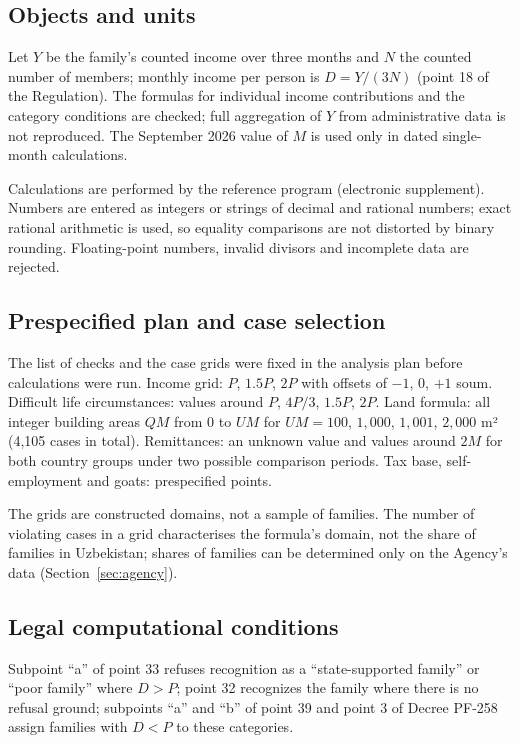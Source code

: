 \documentclass[12pt,a4paper]{extarticle}
\begin{document}
\subsection{Objects and units}
Let $Y$ be the family’s counted income over three months and $N$ the counted number of members; monthly income per person is $D=Y/(3N)$ (point 18 of the Regulation). The formulas for individual income contributions and the category conditions are checked; full aggregation of $Y$ from administrative data is not reproduced. The September 2026 value of $M$ is used only in dated single-month calculations.

Calculations are performed by the reference program (electronic supplement). Numbers are entered as integers or strings of decimal and rational numbers; exact rational arithmetic is used, so equality comparisons are not distorted by binary rounding. Floating-point numbers, invalid divisors and incomplete data are rejected.

\subsection{Prespecified plan and case selection}
The list of checks and the case grids were fixed in the analysis plan before calculations were run. Income grid: $P$, $1.5P$, $2P$ with offsets of $-1$, $0$, $+1$ soum. Difficult life circumstances: values around $P$, $4P/3$, $1.5P$, $2P$. Land formula: all integer building areas $QM$ from $0$ to $UM$ for $UM=100$, $1{,}000$, $1{,}001$, $2{,}000$ m² (4,105 cases in total). Remittances: an unknown value and values around $2M$ for both country groups under two possible comparison periods. Tax base, self-employment and goats: prespecified points.

The grids are constructed domains, not a sample of families. The number of violating cases in a grid characterises the formula’s domain, not the share of families in Uzbekistan; shares of families can be determined only on the Agency’s data (Section~\ref{sec:agency}).

\subsection{Legal computational conditions}
Subpoint “a” of point 33 refuses recognition as a “state-supported family” or “poor family” where $D>P$; point 32 recognizes the family where there is no refusal ground; subpoints “a” and “b” of point 39 and point 3 of Decree PF-258 assign families with $D<P$ to these categories\cite{ref2,ref3}.
\end{document}
